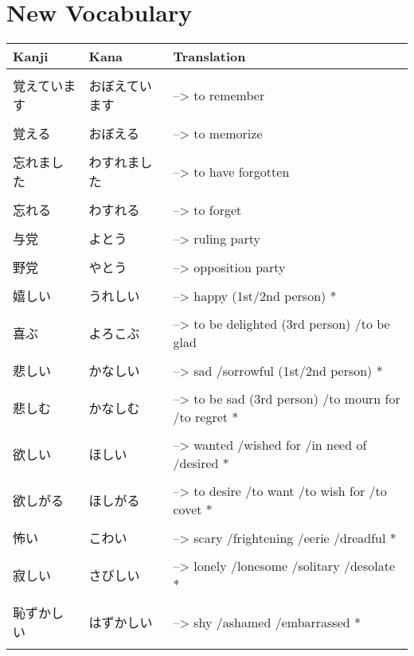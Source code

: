\documentclass{article}
\begin{document}
\part*{New Vocabulary}
\begin{tabular}{ p{3cm} | l l }
Kanji&Kana&Translation\\ \hline\\[-1em]
覚えています&おぼえています&--> to remember \\ \hline\\[-1em]
覚える &おぼえる&--> to memorize \\ \hline\\[-1em]
忘れました &わすれました&--> to have forgotten \\ \hline\\[-1em]
忘れる &わすれる&--> to forget \\ \hline\\[-1em]
与党 &よとう&--> ruling party \\ \hline\\[-1em]
野党 &やとう&--> opposition party \\ \hline\\[-1em]
嬉しい      &うれしい           &--> happy (1st/2nd person) *\\ \hline\\[-1em]
喜ぶ        &よろこぶ           &--> to be delighted (3rd person) /to be glad \\ \hline\\[-1em]
悲しい      &かなしい           &--> sad /sorrowful (1st/2nd person) * \\ \hline\\[-1em]
悲しむ      &かなしむ           &--> to be sad (3rd person) /to mourn for /to regret * \\ \hline\\[-1em]
欲しい      &ほしい             &--> wanted /wished for /in need of /desired * \\ \hline\\[-1em]
欲しがる    &ほしがる           &--> to desire /to want /to wish for /to covet * \\ \hline\\[-1em]
怖い        &こわい             &--> scary  /frightening /eerie /dreadful * \\ \hline\\[-1em]
寂しい      &さびしい           &--> lonely /lonesome /solitary /desolate * \\ \hline\\[-1em]
恥ずかしい  &はずかしい         &--> shy /ashamed /embarrassed * \\ \hline\\[-1em]

\end{tabular}
\end{document}
